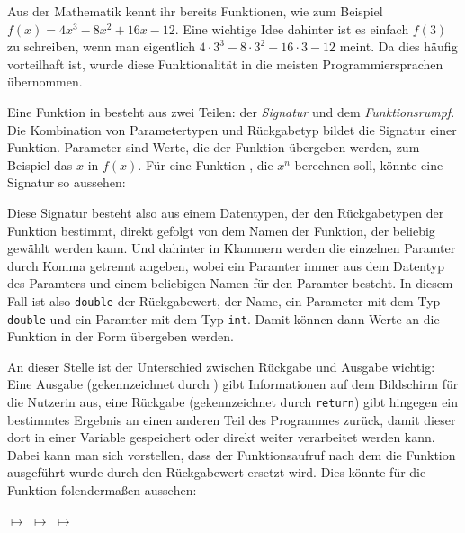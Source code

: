 
Aus der Mathematik kennt ihr bereits Funktionen, wie zum Beispiel $f(x) = 4x^3 - 8x^2 + 16x - 12$.
Eine wichtige Idee dahinter ist es einfach $f(3)$ zu schreiben, wenn man eigentlich $4 \cdot 3^3 - 8 \cdot 3^2 + 16 \cdot 3 - 12$ meint.
Da dies häufig vorteilhaft ist, wurde diese Funktionalität in die meisten Programmiersprachen übernommen.

Eine Funktion in \Cpp besteht aus zwei Teilen: der \emph{Signatur} und dem \emph{Funktionsrumpf}.
Die Kombination von Parametertypen und Rückgabetyp bildet die Signatur einer Funktion.
Parameter sind Werte, die der Funktion übergeben werden, zum Beispiel das $x$ in $f(x)$.
Für eine Funktion , die  $x^n$ berechnen soll, könnte eine Signatur so aussehen:

\begin{center}
\end{center}


Diese Signatur besteht also aus einem Datentypen, der den Rückgabetypen der Funktion bestimmt, direkt gefolgt von dem Namen der Funktion, der beliebig gewählt werden kann.
Und dahinter in Klammern werden die einzelnen Paramter durch Komma getrennt angeben, wobei ein Paramter immer aus dem Datentyp des Paramters und einem beliebigen Namen für den Paramter besteht.
In diesem Fall ist also \texttt{double} der Rückgabewert,  der Name,  ein Parameter mit dem Typ \texttt{double} und  ein Paramter mit dem Typ \texttt{int}.
Damit können dann Werte an die Funktion in der Form  übergeben werden.

An dieser Stelle ist der Unterschied zwischen Rückgabe und Ausgabe wichtig: Eine Ausgabe (gekennzeichnet durch ) gibt Informationen auf dem Bildschirm für die Nutzerin aus, eine Rückgabe (gekennzeichnet durch \texttt{return}) gibt hingegen ein bestimmtes Ergebnis an einen anderen Teil des Programmes zurück, damit dieser dort in einer Variable gespeichert oder direkt weiter verarbeitet werden kann.
Dabei kann man sich vorstellen, dass der Funktionsaufruf nach dem die Funktion ausgeführt wurde durch den Rückgabewert ersetzt wird.
Dies könnte für die Funktion  folendermaßen aussehen:

\begin{center}
	 $\mapsto$  $\mapsto$  $\mapsto$ 
\end{center}


